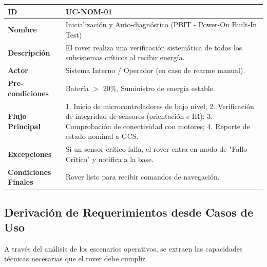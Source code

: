 \begin{table}[H]
	\centering
	\begin{tabularx}{\textwidth}{|l|X|}
		\hline
		\textbf{ID}                  & UC-NOM-01                                                                                                                                                                                     \\ \hline
		\textbf{Nombre}              & Inicialización y Auto-diagnóstico (PBIT - Power-On Built-In Test)                                                                                                                             \\ \hline
		\textbf{Descripción}         & El rover realiza una verificación sistemática de todos los subsistemas críticos al recibir energía.                                                                                           \\ \hline
		\textbf{Actor}               & Sistema Interno / Operador (en caso de rearme manual).                                                                                                                                        \\ \hline
		\textbf{Pre-condiciones}     & Batería $>$ 20\%, Suministro de energía estable.                                                                                                                                              \\ \hline
		\textbf{Flujo Principal}     & 1. Inicio de microcontroladores de bajo nivel; 2. Verificación de integridad de sensores (orientación e IR); 3. Comprobación de conectividad con motores; 4. Reporte de estado nominal a GCS. \\ \hline
		\textbf{Excepciones}         & Si un sensor crítico falla, el rover entra en modo de "Fallo Crítico" y notifica a la base.                                                                                                   \\ \hline
		\textbf{Condiciones Finales} & Rover listo para recibir comandos de navegación.                                                                                                                                              \\ \hline
	\end{tabularx}
\end{table}

\subsection{Derivación de Requerimientos desde Casos de Uso}
A través del análisis de los escenarios operativos, se extraen las capacidades técnicas necesarias que el rover debe cumplir.

